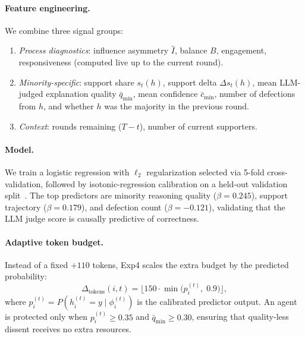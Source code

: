 \paragraph{Feature engineering.}
We combine three signal groups:
\begin{enumerate}[noitemsep,topsep=2pt]
  \item \emph{Process diagnostics}: influence asymmetry $\hat{I}$, balance
        $B$, engagement, responsiveness (computed live up to the current round).
  \item \emph{Minority-specific}: support share $s_t(h)$, support delta
        $\Delta s_t(h)$, mean LLM-judged explanation quality
        $\bar{q}_{\mathrm{min}}$, mean confidence $\bar{c}_{\mathrm{min}}$,
        number of defections from $h$, and whether $h$ was the majority in
        the previous round.
  \item \emph{Context}: rounds remaining ($T-t$), number of current supporters.
\end{enumerate}

\paragraph{Model.}
We train a logistic regression with $\ell_2$ regularization selected via
5-fold cross-validation, followed by isotonic-regression calibration on a
held-out validation split~\cite{pedregosa2011scikit}.
The top predictors are minority reasoning quality ($\beta=0.245$), support
trajectory ($\beta=0.179$), and defection count ($\beta=-0.121$), validating
that the LLM judge score is causally predictive of correctness.

\paragraph{Adaptive token budget.}
Instead of a fixed $+110$ tokens, Exp4 scales the extra budget by the
predicted probability:
\begin{equation}
  \Delta_{\mathrm{tokens}}(i,t)
    = \bigl\lfloor 150 \cdot \min\!\bigl(p_i^{(t)},\;0.9\bigr) \bigr\rfloor,
\end{equation}
where $p_i^{(t)} = P(h_i^{(t)}=y \mid \phi_i^{(t)})$ is the calibrated
predictor output.
An agent is protected only when $p_i^{(t)}\!\geq\!0.35$ and
$\bar{q}_{\mathrm{min}}\!\geq\!0.30$, ensuring that quality-less dissent
receives no extra resources.
